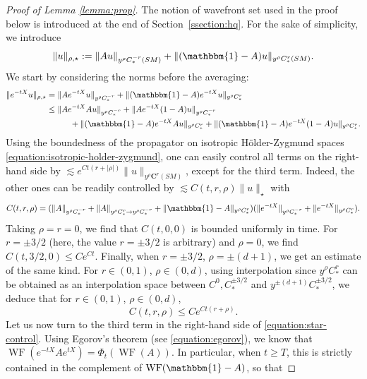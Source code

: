 \documentclass[10pt]{amsart}
\newcommand{\bC}{\boldsymbol{C}}
\DeclareMathOperator{\WF}{WF}
\theoremstyle{plain}
\theoremstyle{definition}
\begin{document}
\begin{proof}[Proof of Lemma \ref{lemma:prop}]
The notion of wavefront set used in the proof below is introduced at the end of Section~\ref{ssection:hq}. For the sake of simplicity, we introduce
\begin{equation}
\label{equation:aniso1bis}
\|u\|_{\rho, \star} := \|Au\|_{y^\rho C^{-r}_*(SM)} + \|(\mathbbm{1}-A)u\|_{y^\rho C^r_*(SM)}.
\end{equation}
We start by considering the norms before the averaging:
\begin{equation}
\label{equation:star-control}
\begin{split}
\| e^{-tX}u\|_{\rho,\star} &= \|A e^{-tX}u\|_{y^\rho C^{-r}_*} + \|(\mathbbm{1}-A) e^{-tX}u \|_{y^\rho C^{r}_*} \\
& \leq \|A e^{-tX}Au\|_{y^\rho C^{-r}_*} + \|A e^{-tX}(1-A)u \|_{y^\rho C^{-r}_*}\\
& \hspace*{1cm}+ \|(\mathbbm{1}-A)e^{-tX}A u\|_{y^\rho C^r_*} + \|(\mathbbm{1}-A)e^{-tX}(1-A)u\|_{y^\rho C^r_*}.
\end{split}
\end{equation}
Using the boundedness of the propagator on isotropic Hölder-Zygmund spaces \eqref{equation:isotropic-holder-zygmund}, one can easily control all terms on the right-hand side by $\lesssim e^{C t (r+ |\rho|)} \|u\|_{y^\rho \bC^r(SM)}$, except for the third term. Indeed, the other ones can be readily controlled by \hbox{$\lesssim C(t,r,\rho)\|u\|_\star$} with
\[
C(t,r,\rho)= ( \|A\|_{y^\rho C^{-r}_*} + \|A\|_{y^\rho C^r_*\to y^\rho C^{-r}_*} + \|\mathbbm{1}-A\|_{y^\rho C^r_*}) ( \| e^{-tX} \|_{y^\rho C^{-r}_*} + \| e^{-tX}\|_{y^\rho C^r_*}).
\]
Taking $\rho = r = 0$, we find that $C(t,0,0)$ is bounded uniformly in time. For $r=\pm 3/2$ (here, the value $r=\pm 3/2$ is arbitrary) and $\rho=0$, we find $C(t,3/2,0) \leq C e^{C t}$. Finally, when $r=\pm 3/2$, $\rho = \pm (d+1)$, we get an estimate of the same kind. For $r \in (0,1)$, $\rho \in (0,d)$, using interpolation since $y^\rho C^r_*$ can be obtained as an interpolation space between $C^0, C^{\pm 3/2}_*$ and $y^{\pm (d+1)} C^{\pm 3/2}_*$, we deduce that for $r\in (0,1)$, $\rho \in (0,d)$,
\begin{equation}\label{eq:exponential-in-time}
C(t,r,\rho) \leq C e^{C t( r+ \rho)}.
\end{equation}
Let us now turn to the third term in the right-hand side of \eqref{equation:star-control}. Using Egorov's theorem (see \eqref{equation:egorov}), we know that $\WF( e^{-tX}Ae^{tX}) = \Phi_{t}(\WF(A))$. In particular, when $t\geq T$, this is strictly contained in the complement of $\WF(\mathbbm{1}-A)$, so that

\end{proof}
\end{document}
